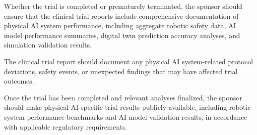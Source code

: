 \begin{description}[leftmargin=2.5cm,style=sameline]

\item[(a)] Whether the trial is completed or prematurely terminated, the sponsor should ensure that the clinical trial reports include comprehensive documentation of physical AI system performance, including aggregate robotic safety data, AI model performance summaries, digital twin prediction accuracy analyses, and simulation validation results.

\item[(b)] The clinical trial report should document any physical AI system-related protocol deviations, safety events, or unexpected findings that may have affected trial outcomes.

\item[(c)] Once the trial has been completed and relevant analyses finalized, the sponsor should make physical AI-specific trial results publicly available, including robotic system performance benchmarks and AI model validation results, in accordance with applicable regulatory requirements.

\end{description}

